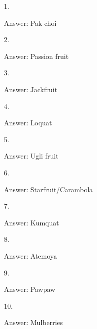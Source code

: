 \documentclass{beamer}
\begin{document}

    \begin{frame}
        1.

        Answer: Pak choi
    \end{frame}

    \begin{frame}
        2. 

        Answer: Passion fruit
    \end{frame}

    \begin{frame}
        3. 

        Answer: Jackfruit
    \end{frame}

    \begin{frame}
        4. 

        Answer: Loquat
    \end{frame}

    \begin{frame}
        5. 

        Answer: Ugli fruit
    \end{frame}

    \begin{frame}
        6. 

        Answer: Starfruit/Carambola
    \end{frame}

    \begin{frame}
        7. 

        Answer: Kumquat
    \end{frame}

    \begin{frame}
        8. 

        Answer: Atemoya
    \end{frame}

    \begin{frame}
        9. 

        Answer: Pawpaw
    \end{frame}

    \begin{frame}
        10. 

        Answer: Mulberries
    \end{frame}
\end{document}
